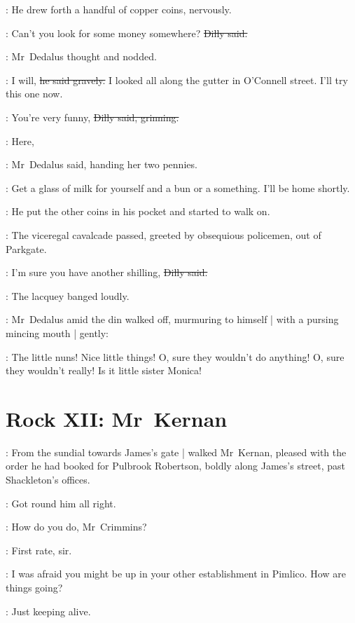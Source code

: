 :
He drew forth a handful of copper coins,%
nervously.

\dilly:
Can't you look for some money somewhere?
\sout{Dilly said.}

:
Mr~Dedalus thought and nodded.

\simon:
I will,
\sout{he said gravely.}
I looked all along the gutter in O'Connell street.
I'll try this one now.

\dilly:
You're very funny,
\sout{Dilly said, grinning.}

\simon:
Here,

:
Mr~Dedalus said,
handing her two pennies.

\simon:
Get a glass of milk for yourself
and a bun or a something.
I'll be home shortly.

:
He put the other coins in his pocket and started to walk on.

\begin{interject}
    : %
    The viceregal cavalcade passed,
    greeted by obsequious policemen,
    out of Parkgate.
\end{interject}%

\dilly:
I'm sure you have another shilling,
\sout{Dilly said.}

:
The lacquey banged loudly.

:
Mr~Dedalus amid the din walked off,
murmuring to himself |
with a pursing mincing mouth |
gently:

\simon:
The little nuns!
Nice little things!
O, sure they wouldn't do anything!
O, sure they wouldn't really!
Is it little sister Monica!


\section*{Rock XII: Mr~Kernan}


:
From the sundial
towards James's gate |
walked Mr~Kernan,
pleased with the order he had booked for Pulbrook Robertson,
boldly along James's street,
past Shackleton's offices.%

:
Got round him all right.

:
How do you do, Mr~Crimmins?

\crimmins:
First rate, sir.

:
I was afraid you might be up in your other establishment in Pimlico.
How are things going?

\crimmins:
Just keeping alive.

